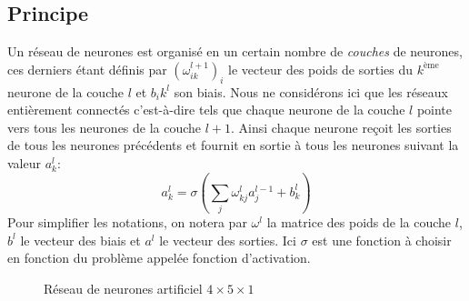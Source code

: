\subsection{Principe}

Un réseau de neurones est organisé en un certain nombre de \emph{couches} de neurones, ces derniers étant définis par $\left( \omega_{ik}^{l+1} \right)_i$ le vecteur des poids de sorties du $k^\text{ème}$ neurone de la couche $l$ et $b_ik^l$ son biais. Nous ne considérons ici que les réseaux entièrement connectés c'est-à-dire tels que chaque neurone de la couche $l$ pointe vers tous les neurones de la couche $l+1$. Ainsi chaque neurone reçoit les sorties de tous les neurones précédents et fournit en sortie à tous les neurones suivant la valeur $a_k^l$:
\begin{equation*}
    a_k^l = \sigma \left( \sum_j \omega^l_{kj} a^{l-1}_j + b^l_k \right)
\end{equation*}
Pour simplifier les notations, on notera par $\omega^l$ la matrice des poids de la couche $l$, $b^l$ le vecteur des biais et $a^l$ le vecteur des sorties. Ici $\sigma$ est une fonction à choisir en fonction du problème appelée fonction d'activation.

\def\layersep{2.5cm}
\begin{figure}[htbp]
\centering
{}
\caption{Réseau de neurones artificiel $4\times 5 \times 1$ } \label{fig:rnn}
\end{figure}

